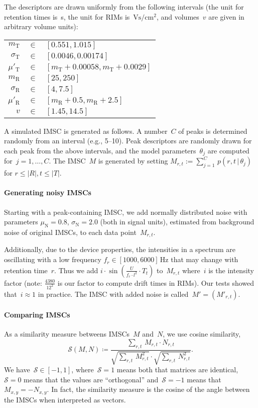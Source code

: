 \documentclass{article}
\newcommand{\given}{\,|\,}
\begin{document}
The descriptors are drawn uniformly from the following intervals (the unit for retention times is~s, the unit for RIMs is~$\text{Vs}/\text{cm}^2$, and volumes~$v$ are given in arbitrary volume units):
\begin{center}\begin{tabular}{r@{ }c@{ }l}
$m_{\text{T}}$ & $\in$ & $[0.551, 1.015]$\\
$\sigma_{\text{T}}$ & $\in$ & $[0.0046, 0.00174]$\\
$\mu'_{\text{T}}$ & $\in$ & $[m_{\text{T}} + 0.00058, m_{\text{T}} + 0.0029]$\\
$m_{\text{R}}$ & $\in$ & $[25, 250]$ \\
$\sigma_{\text{R}}$ &$\in$& $[4, 7.5]$ \\
$\mu'_{\text{R}}$ & $\in$ & $[m_{\text{R}} + 0.5,  m_{\text{R}} + 2.5]$\\
$v$ & $\in$ & $[1.45, 14.5]$\\
\end{tabular}\end{center}



A simulated IMSC is generated as follows.
A number~$C$ of peaks is determined randomly from an interval (e.g., 5--10).
Peak descriptors are randomly drawn for each peak from the above intervals, and the model parameters~$\theta_j$ are computed for~$j=1,\dots,C$.
The IMSC~$M$ is generated by setting $M_{r,t} := \sum_{j=1}^C\, p(r, t \given \theta_j)$ for $r \leq |R|, t \leq |T|$.

\paragraph{Generating noisy IMSCs}
Starting with a peak-containing IMSC, we add normally distributed noise with parameters $\mu_{\text{N}} = 0.8$, $\sigma_{\text{N}} = 2.0$ (both in signal units), estimated from background noise of original IMSCs, to each data point~$M_{r,t}$.

Additionally, due to the device properties, the intensities in a spectrum are oscillating with a low frequency $f_r \in [1000, 6000]\,\text{Hz}$ that may change with retention time~$r$.
Thus we add $i \cdot \sin(\frac{U}{f_r \cdot l^2} \cdot T_t)$ to~$M_{r,t}$ where~$i$ is the intensity factor (note: $\frac{4380}{12^2}$ is our factor to compute drift times in RIMs).
Our tests showed that~$i \approx 1$ in practice.
The IMSC with added noise is called~$M'=(M'_{r,t})$.

\paragraph{Comparing IMSCs}
As a similarity measure betweens IMSCs~$M$ and~$N$, we use cosine similarity,
\[
\mathcal{S}(M, N) \coloneq \frac{\sum_{r,t}\, M_{r,t} \cdot N_{r,t}}{\sqrt{\sum_{r,t}\, M_{r,t}^2} \cdot \sqrt{\sum_{r,t}\, N_{r,t}^2}}.
\]
We have~$\mathcal{S} \in [-1,1]$, where~$\mathcal{S} = 1$ means both that matrices are identical,~$\mathcal{S} = 0$ means that the values are ``orthogonal'' and~$\mathcal{S} = -1$ means that~$M_{x, y} = -N_{x, y}$.
In fact, the similarity measure is the cosine of the angle between the IMSCs when interpreted as vectors.
\end{document}
